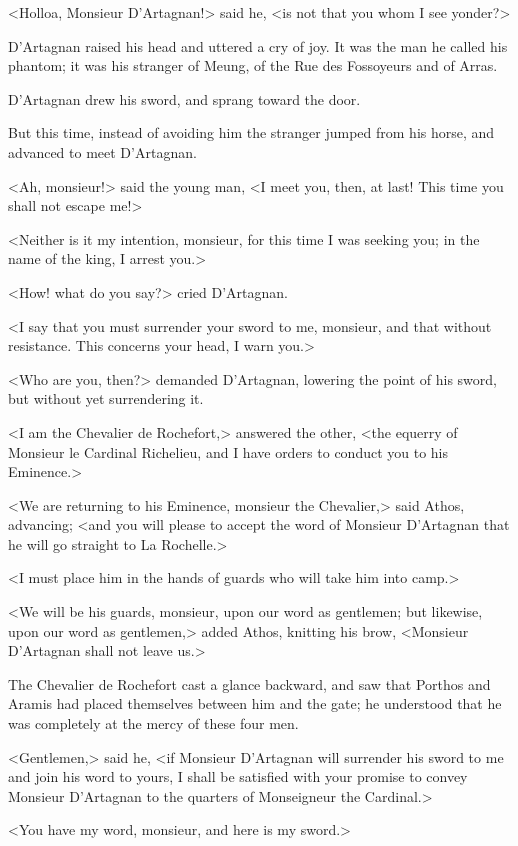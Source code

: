 <Holloa, Monsieur D'Artagnan!> said he, <is not that you whom I see yonder?> 

D'Artagnan raised his head and uttered a cry of joy. It was the man he called his phantom; it was his stranger of Meung, of the Rue des Fossoyeurs and of Arras. 

D'Artagnan drew his sword, and sprang toward the door. 

But this time, instead of avoiding him the stranger jumped from his horse, and advanced to meet D'Artagnan. 

<Ah, monsieur!> said the young man, <I meet you, then, at last! This time you shall not escape me!> 

<Neither is it my intention, monsieur, for this time I was seeking you; in the name of the king, I arrest you.> 

<How! what do you say?> cried D'Artagnan. 

<I say that you must surrender your sword to me, monsieur, and that without resistance. This concerns your head, I warn you.> 

<Who are you, then?> demanded D'Artagnan, lowering the point of his sword, but without yet surrendering it. 

<I am the Chevalier de Rochefort,> answered the other, <the equerry of Monsieur le Cardinal Richelieu, and I have orders to conduct you to his Eminence.> 

<We are returning to his Eminence, monsieur the Chevalier,> said Athos, advancing; <and you will please to accept the word of Monsieur D'Artagnan that he will go straight to La Rochelle.> 

<I must place him in the hands of guards who will take him into camp.> 

<We will be his guards, monsieur, upon our word as gentlemen; but likewise, upon our word as gentlemen,> added Athos, knitting his brow, <Monsieur D'Artagnan shall not leave us.> 

The Chevalier de Rochefort cast a glance backward, and saw that Porthos and Aramis had placed themselves between him and the gate; he understood that he was completely at the mercy of these four men. 

<Gentlemen,> said he, <if Monsieur D'Artagnan will surrender his sword to me and join his word to yours, I shall be satisfied with your promise to convey Monsieur D'Artagnan to the quarters of Monseigneur the Cardinal.> 

<You have my word, monsieur, and here is my sword.> 

